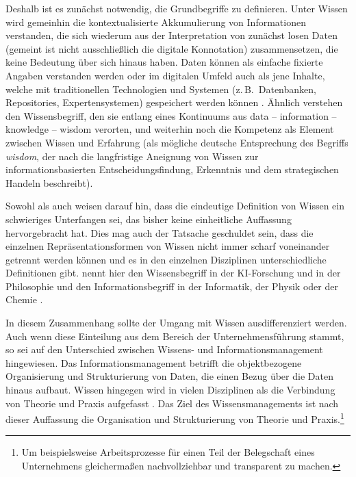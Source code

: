 Deshalb ist es zunächst notwendig, die Grundbegriffe zu definieren. Unter Wissen wird gemeinhin die kontextualisierte Akkumulierung von Informationen verstanden, die sich wiederum aus der Interpretation von zunächst losen Daten (gemeint ist nicht ausschließlich die digitale Konnotation) zusammensetzen, die keine Bedeutung über sich hinaus haben. Daten können als einfache fixierte Angaben verstanden werden oder im digitalen Umfeld auch als \glqq jene Inhalte, welche mit traditionellen Technologien und Systemen (z.\,B.\ Datenbanken, Repositories, Expertensystemen) gespeichert werden können\grqq{} \citep[54]{lehner_wissensmanagement:_2014}. Ähnlich verstehen \citeauthor{schopflin_practical_2018} den Wissensbegriff, den sie entlang eines Kontinuums aus \glqq data -- information -- knowledge -- wisdom\grqq{} \citep[][2]{schopflin_practical_2018} verorten, und weiterhin noch die Kompetenz als Element zwischen Wissen und Erfahrung (als mögliche deutsche Entsprechung des Begriffs \emph{wisdom}, der nach \citeauthor{schopflin_practical_2018} die langfristige Aneignung von Wissen zur informationsbasierten Entscheidungsfindung, Erkenntnis und dem strategischen Handeln beschreibt).\largerpage

Sowohl \citeauthor{lehner_wissensmanagement:_2014} als auch \citeauthor{schopflin_practical_2018} weisen darauf hin, dass die eindeutige Definition von Wissen ein schwieriges Unterfangen sei, das bisher keine einheitliche Auffassung hervorgebracht hat. Dies mag auch der Tatsache geschuldet sein, dass die einzelnen Repräsentationsformen von Wissen nicht immer scharf voneinander getrennt werden können und es in den einzelnen Disziplinen unterschiedliche Definitionen gibt. \citeauthor{lehner_wissensmanagement:_2014} nennt hier den Wissensbegriff in der KI-Forschung und in der Philosophie und den Informationsbegriff in der Informatik, der Physik oder der Chemie \citep[54]{lehner_wissensmanagement:_2014}.

In diesem Zusammenhang sollte der Umgang mit Wissen ausdifferenziert werden. Auch wenn diese Einteilung aus dem Bereich der Unternehmensführung stammt, so sei auf den Unterschied zwischen Wissens- und Informationsmanagement hingewiesen. Das Informationsmanagement betrifft die objektbezogene Organisierung und Strukturierung von Daten, die einen Bezug über die Daten hinaus aufbaut. Wissen hingegen wird in vielen Disziplinen als die Verbindung von Theorie und Praxis aufgefasst \citep[2]{megill_thinking_2005}. Das Ziel des Wissensmanagements ist nach dieser Auffassung die Organisation und Strukturierung von Theorie und Praxis.\footnote{Um beispielsweise Arbeitsprozesse für einen Teil der Belegschaft eines Unternehmens gleichermaßen nachvollziehbar und transparent zu machen.}

